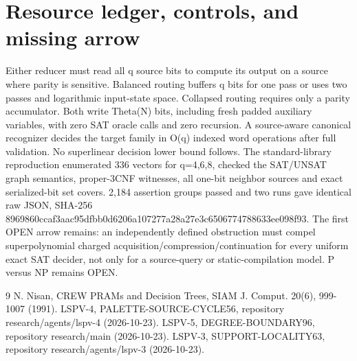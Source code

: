 \documentclass{article}
\begin{document}
\section{Resource ledger, controls, and missing arrow}
Either reducer must read all q source bits to compute its output on a source where parity is sensitive. Balanced routing buffers q bits for one pass or uses two passes and logarithmic input-state space. Collapsed routing requires only a parity accumulator. Both write Theta(N) bits, including fresh padded auxiliary variables, with zero SAT oracle calls and zero recursion. A source-aware canonical recognizer decides the target family in O(q) indexed word operations after full validation. No superlinear decision lower bound follows.
The standard-library reproduction enumerated 336 vectors for q=4,6,8, checked the SAT/UNSAT graph semantics, proper-3CNF witnesses, all one-bit neighbor sources and exact serialized-bit set covers. 2,184 assertion groups passed and two runs gave identical raw JSON, SHA-256 8969860ccaf3aac95dfbb0d6206a107277a28a27e3c6506774788633ee098f93.
The first OPEN arrow remains: an independently defined obstruction must compel superpolynomial charged acquisition/compression/continuation for every uniform exact SAT decider, not only for a source-query or static-compilation model. P versus NP remains OPEN.
\begin{thebibliography}{9}
 N. Nisan, CREW PRAMs and Decision Trees, SIAM J. Comput. 20(6), 999-1007 (1991).
 LSPV-4, PALETTE-SOURCE-CYCLE56, repository research/agents/lspv-4 (2026-10-23).
 LSPV-5, DEGREE-BOUNDARY96, repository research/main (2026-10-23).
 LSPV-3, SUPPORT-LOCALITY63, repository research/agents/lspv-3 (2026-10-23).
\end{thebibliography}
\end{document}
